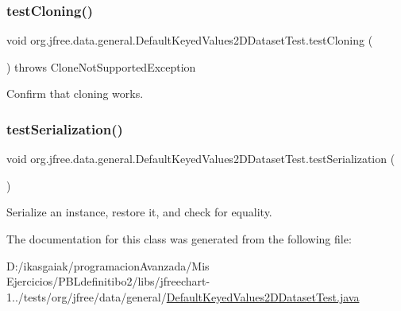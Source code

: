 \subsubsection{\texorpdfstring{test\+Cloning()}{testCloning()}}
{\footnotesize\ttfamily void org.\+jfree.\+data.\+general.\+Default\+Keyed\+Values2\+D\+Dataset\+Test.\+test\+Cloning (\begin{DoxyParamCaption}{ }\end{DoxyParamCaption}) throws Clone\+Not\+Supported\+Exception}

Confirm that cloning works. \mbox{\label{classorg_1_1jfree_1_1data_1_1general_1_1_default_keyed_values2_d_dataset_test_a395aeb07712ae4fe1f9c4fd967bb896d}} 
\subsubsection{\texorpdfstring{test\+Serialization()}{testSerialization()}}
{\footnotesize\ttfamily void org.\+jfree.\+data.\+general.\+Default\+Keyed\+Values2\+D\+Dataset\+Test.\+test\+Serialization (\begin{DoxyParamCaption}{ }\end{DoxyParamCaption})}

Serialize an instance, restore it, and check for equality. 

The documentation for this class was generated from the following file\+:\begin{DoxyCompactItemize}
\item 
D\+:/ikasgaiak/programacion\+Avanzada/\+Mis Ejercicios/\+P\+B\+Ldefinitibo2/libs/jfreechart-\/1../tests/org/jfree/data/general/\mbox{\hyperlink{_default_keyed_values2_d_dataset_test_8java}{Default\+Keyed\+Values2\+D\+Dataset\+Test.\+java}}\end{DoxyCompactItemize}
